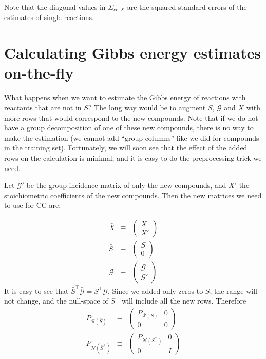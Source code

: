 \documentclass[11pt]{article}
\newcommand{\Gmat}{\mathcal{G}}
\newcommand{\PRmat}[1]{P_{\mathcal{R}\left(#1\right)}}
\newcommand{\PNmat}[1]{P_{\mathcal{N}\left(#1\right)}}
\begin{document}
Note that the diagonal values in $\Sigma_{cc,X}$ are the squared standard errors of the estimates of single reactions.


\section{Calculating Gibbs energy estimates on-the-fly}

What happens when we want to estimate the Gibbs energy of reactions with reactants that are not in $S$? The long way would be to augment $S$, $\Gmat$ and $X$ with more rows that would correspond to the new compounds. Note that if we do not have a group decomposition of one of these new compounds, there is no way to make the estimation (we cannot add ``group columns'' like we did for compounds in the training set). Fortunately, we will soon see that the effect of the added rows on the calculation is minimal, and it is easy to do the preprocessing trick we need.

Let $\Gmat'$ be the group incidence matrix of only the new compounds, and $X'$ the stoichiometric coefficients of the new compounds. Then the new matrices we need to use for CC are:

\begin{eqnarray}
	\bar{X} & \equiv & \left( \begin{array}{c} X \\ \hline X' \end{array} \right) \\
	\bar{S} & \equiv & \left( \begin{array}{c} S \\ \hline 0 \end{array} \right) \\
	\bar{\Gmat} & \equiv & \left( \begin{array}{c} \Gmat \\ \hline \Gmat'\end{array} \right)
\end{eqnarray}
It is easy to see that $\bar{S}^\top \bar{\Gmat} = S^\top \Gmat$. Since we added only zeros to $S$, the range will not change, and the null-space of $S^\top$ will include all the new rows. Therefore
\begin{eqnarray}
	\PRmat{\bar{S}} & \equiv & \left( \begin{array}{c|c} \PRmat{S} & 0 \\ \hline 0 & 0 \end{array} \right)	 \\
	\PNmat{\bar{S}^\top} & \equiv & \left( \begin{array}{c|c} \PNmat{S^\top} & 0 \\ \hline 0 & I \end{array} \right)
\end{eqnarray}
\end{document}
